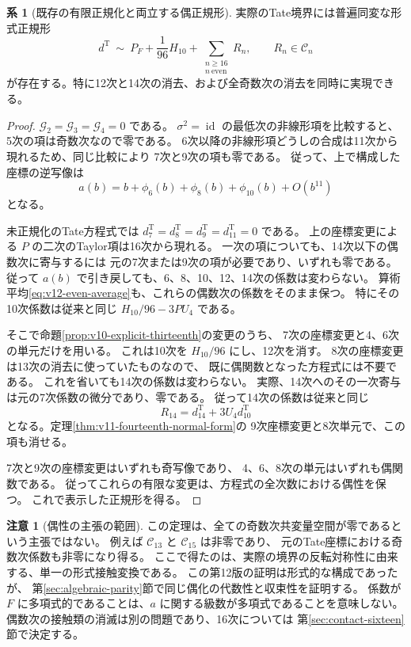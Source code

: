 \documentclass[a4paper,11pt]{ltjsarticle}
\theoremstyle{definition}
\newtheorem{remark}[theorem]{注意}
\newtheorem{corollary}[theorem]{系}
\begin{document}
\begin{corollary}[既存の有限正規化と両立する偶正規形]
\label{cor:v12-even-hessian-normal-form}
実際のTate境界には普遍同変な形式正規形
\begin{equation}\label{eq:v12-even-hessian-normal-form}
 \boxed{\displaystyle
 d^{\mathrm T}\ \sim\
 P_F+\frac1{96}H_{10}
       +\sum_{\substack{n\ge16\\ n\ \mathrm{even}}}R_n,
 \qquad R_n\in\mathcal C_n
 }
\end{equation}
が存在する。特に12次と14次の消去、および全奇数次の消去を同時に実現できる。
\end{corollary}
\begin{proof}
$\mathcal G_2=\mathcal G_3=\mathcal G_4=0$ である。
$\sigma^2=\operatorname{id}$ の最低次の非線形項を比較すると、
5次の項は奇数次なので零である。
6次以降の非線形項どうしの合成は11次から現れるため、同じ比較により
7次と9次の項も零である。
従って、上で構成した座標の逆写像は
\[
 a(b)=b+\phi_6(b)+\phi_8(b)+\phi_{10}(b)+O(b^{11})
\]
となる。

未正規化のTate方程式では
$d^{\mathrm T}_7=d^{\mathrm T}_8=d^{\mathrm T}_9=d^{\mathrm T}_{11}=0$
である。
上の座標変更による $P$ の二次のTaylor項は16次から現れる。
一次の項についても、14次以下の偶数次に寄与するには
元の7次または9次の項が必要であり、いずれも零である。
従って $a(b)$ で引き戻しても、6、8、10、12、14次の係数は変わらない。
算術平均\eqref{eq:v12-even-average}も、これらの偶数次の係数をそのまま保つ。
特にその10次係数は従来と同じ
$H_{10}/96-3PU_4$ である。

そこで命題\ref{prop:v10-explicit-thirteenth}の変更のうち、
7次の座標変更と4、6次の単元だけを用いる。
これは10次を $H_{10}/96$ にし、12次を消す。
8次の座標変更は13次の消去に使っていたものなので、
既に偶関数となった方程式には不要である。
これを省いても14次の係数は変わらない。
実際、14次へのその一次寄与は元の7次係数の微分であり、零である。
従って14次の係数は従来と同じ
\[
 R_{14}=d^{\mathrm T}_{14}+3U_4d^{\mathrm T}_{10}
\]
となる。定理\ref{thm:v11-fourteenth-normal-form}の
9次座標変更と8次単元で、この項も消せる。

7次と9次の座標変更はいずれも奇写像であり、
4、6、8次の単元はいずれも偶関数である。
従ってこれらの有限な変更は、方程式の全次数における偶性を保つ。
これで表示した正規形を得る。
\end{proof}

\begin{remark}[偶性の主張の範囲]
この定理は、全ての奇数次共変量空間が零であるという主張ではない。
例えば $\mathcal C_{13}$ と $\mathcal C_{15}$ は非零であり、
元のTate座標における奇数次係数も非零になり得る。
ここで得たのは、実際の境界の反転対称性に由来する、単一の形式接触変換である。
この第12版の証明は形式的な構成であったが、
第\ref{sec:algebraic-parity}節で同じ偶化の代数性と収束性を証明する。
係数が $F$ に多項式的であることは、$a$ に関する級数が多項式であることを意味しない。
偶数次の接触類の消滅は別の問題であり、16次については
第\ref{sec:contact-sixteen}節で決定する。
\end{remark}
\end{document}
